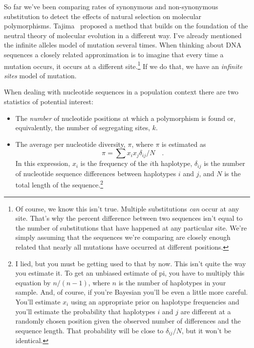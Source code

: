 \documentclass[12pt]{article}
\begin{document}
So far we've been comparing rates of synonymous and non-synonymous
substitution to detect the effects of natural selection on molecular
polymorphisms. Tajima~\cite{Tajima89} proposed a method that builds on
the foundation of the neutral theory of molecular evolution in a
different way. I've already mentioned the infinite alleles model of
mutation several times. When thinking about DNA sequences a closely
related approximation is to imagine that every time a mutation occurs,
it occurs at a different site.\footnote{Of course, we know this isn't
  true. Multiple substitutions {\it can\/} occur at any site. That's
  why the percent difference between two sequences isn't equal to the
  number of substitutions that have happened at any particular
  site. We're simply assuming that the sequences we're comparing are
  closely enough related that nearly all mutations have occurred at
  different positions.} If we do that, we have an {\it infinite
  sites\/} model of mutation.

When dealing with nucleotide sequences in a population context there
are two statistics of potential interest:

\begin{itemize}

\item The {\it number\/} of nucleotide positions at which a
  polymorphism is found or, equivalently, the number of segregating
  sites, $k$.

\item The average per nucleotide diversity, $\pi$, where $\pi$ is
  estimated as
\[
\pi = \sum x_ix_j\delta_{ij}/N \quad .
\]
In this expression, $x_i$ is the frequency of the $i$th haplotype,
$\delta_{ij}$ is the number of nucleotide sequence differences between
haplotypes $i$ and $j$, and $N$ is the total length of the
sequence.\footnote{I lied, but you must be getting used to that by
  now. This isn't quite the way you estimate it. To get an unbiased
  estimate of pi, you have to multiply this equation by $n/(n-1)$,
  where $n$ is the number of haplotypes in your sample. And, of
  course, if you're Bayesian you'll be even a little more
  careful. You'll estimate $x_i$ using an appropriate prior on
  haplotype frequencies and you'll estimate the probability that
  haplotypes $i$ and $j$ are different at a randomly chosen position
  given the observed number of differences and the sequence
  length. That probability will be close to $\delta_{ij}/N$, but it
  won't be identical.}

\end{itemize}
\end{document}
